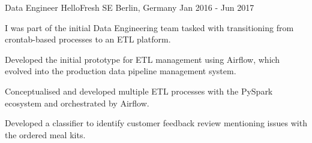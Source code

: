 \begin{cventries}


\begin{comment}
  \cventry
    {Lead NLP Engineer} %
    {Comtravo GmbH} %
    {Berlin, Germany} %
    {Aug 2017 - Apr 2022} %
	{
      \begin{cvitems} %
		\item {Joined as an NLP Engineer in August 2017, was promoted to Senior NLP Engineer in July 2019, and in June 2021 to Lead NLP Engineer.}
        \item {Led a team of 3 developers + 4 annotators, working on the system that automatically answers incoming email travel requests and assists travel agents in handling them. Coordinating development tasks based on system performance and feature requests.}
        \item {Trained, evaluated and improved different models for text classification and fine-grained NER, increasing the performance of identifying specific booking requests and performing information extraction to automatically fulfil booking requests.}
		\item {Developed algorithms to map input text into unique Knowledge Base identifiers, e.g: airports, train stations, hotels, geographic locations.}		
      \end{cvitems}
    }
\end{comment}


  \cventry
    {Data Engineer} %
    {HelloFresh SE} %
    {Berlin, Germany} %
    {Jan 2016 - Jun 2017} %
    {
      \begin{cvitems} %
        \item {I was part of the initial Data Engineering team tasked with transitioning from crontab-based processes to an ETL platform.}
        \item {Developed the initial prototype for ETL management using Airflow, which evolved into the production data pipeline management system.}
		\item {Conceptualised and developed multiple ETL processes with the PySpark ecosystem and orchestrated by Airflow.}
        \item {Developed a classifier to identify customer feedback review mentioning issues with the ordered meal kits.}
      \end{cvitems}
    }
	

\end{cventries}
